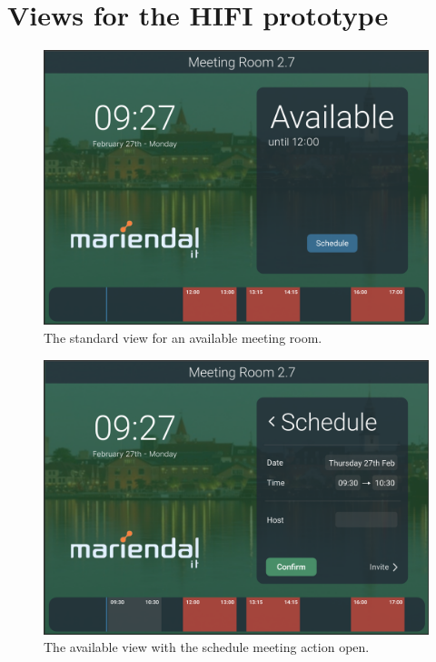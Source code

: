 \section{Views for the HIFI prototype}\label{appendix:hifi_prototype}
\begin{figure}[h!]
    \centering
    \includegraphics[width=1\textwidth]{images/available_normal.png}
    \caption{The standard view for an available meeting room.}
    \label{fig:available_normal}
  \end{figure}

  \begin{figure}[h!]
    \centering
    \includegraphics[width=1\textwidth]{images/available_schedule.png}
    \caption{The available view with the schedule meeting action open.}
    \label{fig:available_schedule}
  \end{figure}

